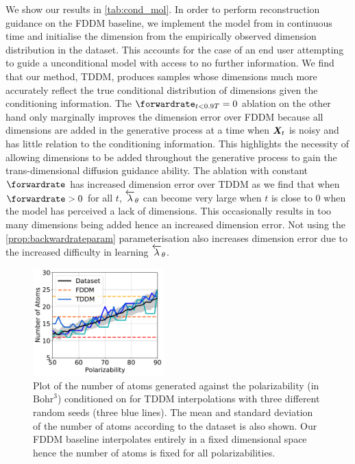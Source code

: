 We show our results in \cref{tab:cond_mol}. In order to perform reconstruction guidance on the FDDM baseline, we implement the model from \citet{hoogeboom2022equivariant} in continuous time and initialise the dimension from the empirically observed dimension distribution in the dataset.  This accounts for the case of an end user attempting to guide a unconditional model with access to no further information. We find that our method, TDDM, produces samples whose dimensions much more accurately reflect the true conditional distribution of dimensions given the conditioning information.
The $\forwardrate_{t<0.9T} = 0$ ablation on the other hand only marginally improves the dimension error over FDDM because all dimensions are added in the generative process at a time when ${\bm{X}}_t$ is noisy and has little relation to the conditioning information. This highlights the necessity of allowing dimensions to be added throughout the generative process to gain the trans-dimensional diffusion guidance ability. The ablation with constant $\forwardrate$ has increased dimension error over TDDM as we find that when $\forwardrate > 0$ for all $t$, $\overleftarrow{\lambda}_\theta$ can become very large when $t$ is close to 0 when the model has perceived a lack of dimensions. This occasionally results in too many dimensions being added hence an increased dimension error. Not using the \cref{prop:backwardrateparam} parameterisation also increases dimension error due to the increased difficulty in learning $\overleftarrow{\lambda}_\theta$.

\begin{figure}[t]
    \centering
    \includegraphics[width=0.45\textwidth]{figs/tddm/polarizability_vs_num_atoms.pdf}
    \caption{Plot of the number of atoms generated against the polarizability (in $\text{Bohr}^3$) conditioned on for TDDM interpolations with three different random seeds (three blue lines). The mean and standard deviation of the number of atoms according to the dataset is also shown. Our FDDM baseline interpolates entirely in a fixed dimensional space hence the number of atoms is fixed for all polarizabilities.}
    \label{fig:tddm-interp_plot}
\end{figure}

